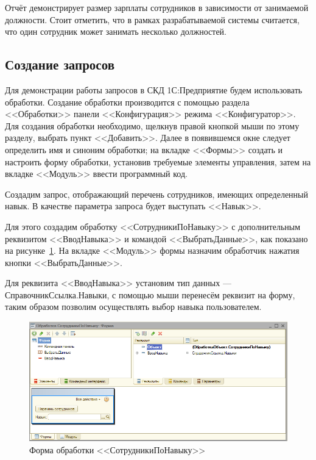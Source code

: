 Отчёт демонстрирует размер зарплаты сотрудников в зависимости от занимаемой
должности. Стоит отметить, что в рамках разрабатываемой системы считается,
что один сотрудник может занимать несколько должностей.

\pagebreak

\subsection{Создание запросов}

Для демонстрации работы запросов в СКД 1С:Предприятие будем
использовать обработки.
Создание обработки производится с помощью раздела
<<Обработки>> панели <<Конфигурация>> режима <<Конфигуратор>>.
Для создания обработки необходимо,
щелкнув правой кнопкой мыши по этому
разделу, выбрать пункт <<Добавить>>. Далее в появившемся окне
следует определить имя и синоним обработки;
на вкладке <<Формы>> создать и настроить форму обработки,
установив требуемые элементы управления, затем на вкладке
<<Модуль>> ввести программный код.



Создадим запрос, отображающий перечень сотрудников, имеющих определенный навык.
В качестве параметра запроса будет выступать <<Навык>>.

Для этого создадим обработку <<СотрудникиПоНавыку>>
с дополнительным реквизитом <<ВводНавыка>> и командой
<<ВыбратьДанные>>, как показано на рисунке~\ref{fig:employees_by_skill_query}.
На вкладке <<Модуль>> формы назначим обработчик нажатия кнопки
<<ВыбратьДанные>>.

Для реквизита <<ВводНавыка>> установим тип данных --- СправочникСсылка.Навыки,
с помощью мыши перенесём реквизит на форму, таким образом позволим осуществлять
выбор навыка пользователем.

\begin{figure}[h!]
  \centering
  \includegraphics[width=150mm]{pic/employees_by_skill_query}
  \caption{Форма обработки <<СотрудникиПоНавыку>>}
  \label{fig:employees_by_skill_query}
\end{figure}

